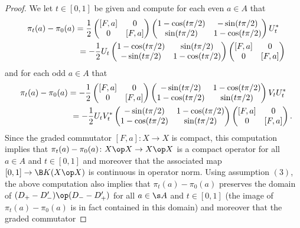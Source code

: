 \begin{proof}
We let $t \in [0,1]$ be given and compute for each even $a \in A$ that
\begin{gather*}
\pi_t(a) - \pi_0(a)
 = \frac{1}{2} \left(\begin{matrix} [F,a] & 0 \\ 0 & [F,a]\end{matrix}\right) \left(\begin{matrix} 1 - \cos(t \pi/2) & - \sin(t \pi /2) \\ \sin(t \pi/2) & 1 - \cos( t \pi/2)\end{matrix}\right) U_t^* \nonumber\\
\hphantom{\pi_t(a) - \pi_0(a)=}{} = -\frac{1}{2} U_t \left(\begin{matrix} 1 - \cos(t \pi/2) & \sin(t \pi /2) \\ -\sin(t \pi/2) & 1 - \cos( t \pi/2)\end{matrix}\right) \left(\begin{matrix} [F,a] & 0 \\ 0 & [F,a]\end{matrix}\right)%
\end{gather*}
and for each odd $a \in A$ that
\begin{gather*}
\pi_t(a) - \pi_0(a)
 = - \frac{1}{2} \left(\begin{matrix} [F,a] & 0 \\ 0 & [F,a]\end{matrix}\right)
\left(\begin{matrix} -\sin(t \pi / 2) & 1 - \cos(t \pi/2) \\ 1 - \cos( t \pi/2) & \sin(t \pi/2) \end{matrix}\right) V_t U_t^* \\
\hphantom{\pi_t(a) - \pi_0(a)=}{} = -\frac{1}{2} U_t V_t^* \left(\begin{matrix} -\sin(t \pi / 2) & 1 - \cos(t \pi/2) \\ 1 - \cos( t \pi/2) & \sin(t \pi/2) \end{matrix}\right) \left(\begin{matrix} [F,a] & 0 \\ 0 & [F,a]\end{matrix}\right) .%
\end{gather*}
Since the graded commutator $[F,a]\colon X \to X$ is compact, this computation implies that $\pi_t(a) - \pi_0(a)\colon X \op X \to X \op X$ is a compact operator for all $a \in A$ and $t \in [0,1]$ and moreover that the associated map $[0,1] \to \B K(X \op X)$ is continuous in operator norm. Using assumption $(3)$, the above computation also implies that $\pi_t(a) - \pi_0(a)$ preserves the domain of $(D_+ - D_-') \op (D_- - D_+')$ for all $a \in \s A$ and $t \in [0,1]$ (the image of $\pi_t(a) - \pi_0(a)$ is in fact contained in this domain) and moreover that the graded commutator

\end{proof}
